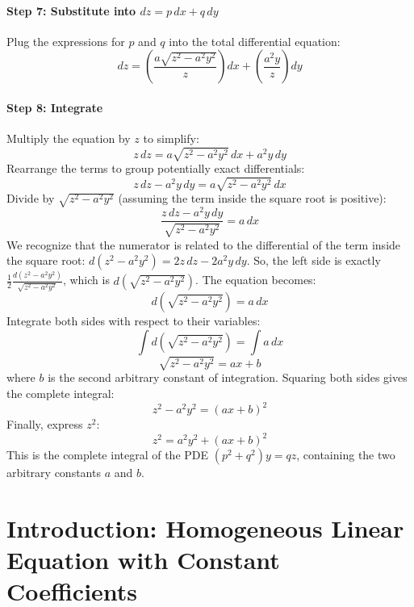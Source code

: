 \documentclass{article}
\theoremstyle{remark}
\begin{document}
	\paragraph{Step 7: Substitute into $dz = p \, dx + q \, dy$}
	Plug the expressions for $p$ and $q$ into the total differential equation:
	\begin{equation*}
		dz = \left( \frac{a \sqrt{z^2 - a^2 y^2}}{z} \right) dx + \left( \frac{a^2 y}{z} \right) dy
	\end{equation*}
	
	\paragraph{Step 8: Integrate}
	Multiply the equation by $z$ to simplify:
	\begin{equation*}
		z \, dz = a \sqrt{z^2 - a^2 y^2} \, dx + a^2 y \, dy
	\end{equation*}
	Rearrange the terms to group potentially exact differentials:
	\begin{equation*}
		z \, dz - a^2 y \, dy = a \sqrt{z^2 - a^2 y^2} \, dx
	\end{equation*}
	Divide by $\sqrt{z^2 - a^2 y^2}$ (assuming the term inside the square root is positive):
	\[ \frac{z \, dz - a^2 y \, dy}{\sqrt{z^2 - a^2 y^2}} = a \, dx \]
	We recognize that the numerator is related to the differential of the term inside the square root: $d(z^2 - a^2 y^2) = 2z \, dz - 2a^2 y \, dy$.
	So, the left side is exactly $\frac{1}{2} \frac{d(z^2 - a^2 y^2)}{\sqrt{z^2 - a^2 y^2}}$, which is $d(\sqrt{z^2 - a^2 y^2})$.
	The equation becomes:
	\[ d(\sqrt{z^2 - a^2 y^2}) = a \, dx \]
	Integrate both sides with respect to their variables:
	\[ \int d(\sqrt{z^2 - a^2 y^2}) = \int a \, dx \]
	\[ \sqrt{z^2 - a^2 y^2} = ax + b \]
	where $b$ is the second arbitrary constant of integration.
	Squaring both sides gives the complete integral:
	\[ z^2 - a^2 y^2 = (ax + b)^2 \]
	Finally, express $z^2$:
	\begin{equation} \label{eq:final_sol_ex_charpit_example}
		\boxed{z^2 = a^2 y^2 + (ax + b)^2}
	\end{equation}
	This is the complete integral of the PDE $(p^2 + q^2)y = qz$, containing the two arbitrary constants $a$ and $b$.
	
	\newpage
	
	\section{Introduction: Homogeneous Linear Equation with Constant Coefficients}
	
\end{document}
